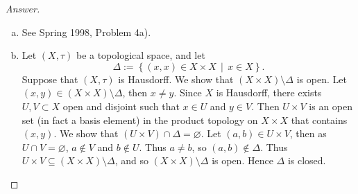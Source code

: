 \documentclass[12pt]{article}
\newcommand\setb[1]{\left \{ #1 \right \}}
\theoremstyle{definition}
\begin{document}
\begin{proof}[Answer]
    \noindent
    \begin{enumerate}[(a)]
        \item See Spring 1998, Problem 4a).
        \item Let $(X,\tau)$ be a topological space, and let
        \[
            \Delta := \setb{ (x,x) \in X \times X \, \middle| \, x \in X }.
        \]
        Suppose that $(X,\tau)$ is Hausdorff. We show that $(X \times X) \setminus \Delta$ is open. Let $(x,y) \in (X \times X) \setminus \Delta$, then $x \neq y$. Since $X$ is Hausdorff, there exists $U , V \subset X$ open and disjoint such that $x \in U$ and $y \in V$. Then $U \times V$ is an open set (in fact a basis element) in the product topology on $X \times X$ that contains $(x,y)$. We show that $(U \times V) \cap \Delta = \varnothing$. Let $(a,b) \in U \times V$, then as $U \cap V = \varnothing$, $a \notin V$ and $b \notin U$. Thus $a \neq b$, so $(a,b) \notin \Delta$. Thus $U \times V \subseteq (X \times X) \setminus \Delta$, and so $(X \times X) \setminus \Delta$ is open. Hence $\Delta$ is closed.
        

\end{enumerate}
\end{proof}
\end{document}
